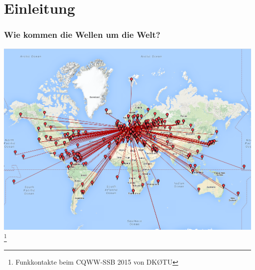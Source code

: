 

\subtitle{Technik 09: \\
           Die Wellenausbreitung \\[2em]}
\date{Stand 01.12.2015}



\section*{Einleitung}

\begin{frame}
    \frametitle{Wie kommen die Wellen um die Welt?}
    \begin{center}
        \includegraphics[width=1\textwidth,height=.8\textheight,keepaspectratio]{e09/cqww-kontakte-2015.png}
        \footnote{\tiny Funkkontakte beim CQWW-SSB 2015 von DK\O TU}
    \end{center}
\end{frame}

